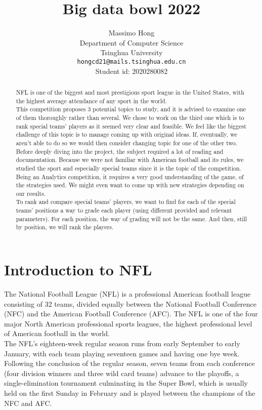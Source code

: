 \documentclass{article}
\title{Big data bowl 2022}
\author{
  Massimo Hong\\
  Department of Computer Science\\
  Tsinghua University\\
  \texttt{hongcd21@mails.tsinghua.edu.cn} \\
  Student id: 2020280082}
\begin{document}
\maketitle

\begin{abstract}
  NFL is one of the biggest and most prestigious sport league in the United States, with the highest average attendance of any sport in the world. \\
This competition proposes 3 potential topics to study, and it is advised to examine one of them thoroughly rather than several. We chose to work on the third one which is to rank special teams’ players as it seemed very clear and feasible. We feel like the biggest challenge of this topic is to manage coming up with original ideas. If, eventually, we aren’t able to do so we would then consider changing topic for one of the other two.
Before deeply diving into the project, the subject required a lot of reading and documentation.
Because we were not familiar with American football and its rules, we studied the sport and especially special teams since it is the topic of the competition. Being an Analytics competition, it requires a very good understanding of the game, of the strategies used. We might even want to come up with new strategies depending on our results.\\
To rank and compare special teams’ players, we want to find for each of the special teams’ positions a way to grade each player (using different provided and relevant parameters). For each position, the way of grading will not be the same. And then, still by position, we will rank the players.
\end{abstract}
\section{Introduction to NFL}
The National Football League (NFL) is a professional American football league consisting of 32 teams, divided equally between the National Football Conference (NFC) and the American Football Conference (AFC). The NFL is one of the four major North American professional sports leagues, the highest professional level of American football in the world. \\
The NFL's eighteen-week regular season runs from early September to early January, with each team playing seventeen games and having one bye week. Following the conclusion of the regular season, seven teams from each conference (four division winners and three wild card teams) advance to the playoffs, a single-elimination tournament culminating in the Super Bowl, which is usually held on the first Sunday in February and is played between the champions of the NFC and AFC.
\end{document}
